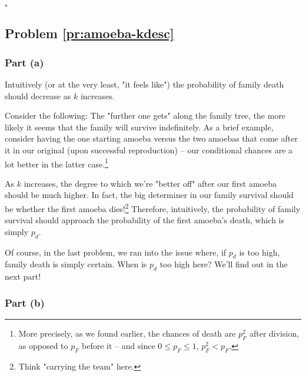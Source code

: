 


$\square$


\subsection{Problem \ref{pr:amoeba-kdesc}}

\subsubsection{Part (a)}

Intuitively (or at the very least, "it feels like") the probability of family death should decrease as $k$ increases.

Consider the following: The "further one gets" along the family tree, the more likely it seems that the family will survive indefinitely. As a brief example, consider having the one starting amoeba versus the two amoebas that come after it in our original (upon successful reproduction) -- our conditional chances are a lot better in the latter case.\footnote{More precisely, as we found earlier, the chances of death are $p_F^2$ after division, as opposed to $p_F$ before it -- and since $0 \leq p_F \leq 1$, $p_F^2 < p_F$.}

As $k$ increases, the degree to which we're "better off" after our first amoeba should be much higher. In fact, the big determiner in our family survival should be whether the first amoeba dies!\footnote{Think "carrying the team" here.} Therefore, intuitively, the probability of family survival should approach the probability of the first amoeba's death, which is simply $p_d$. 

Of course, in the last problem, we ran into the issue where, if $p_d$ is too high, family death is simply certain. When is $p_d$ too high here? We'll find out in the next part!

\subsubsection{Part (b)}

